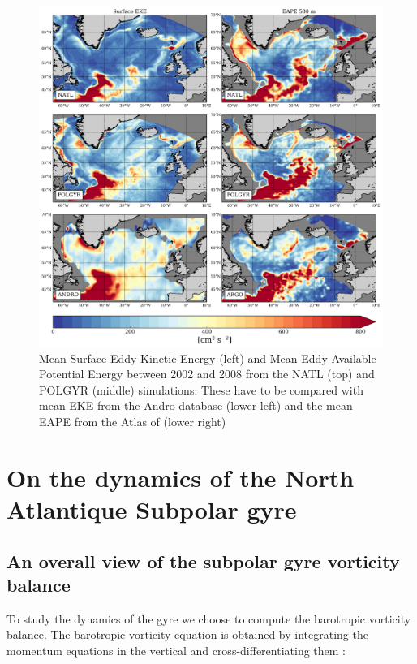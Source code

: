 \documentclass[11pt,a4paper]{article}
\begin{document}
\begin{figure}[H]
\centerline{\includegraphics[width=18cm]{./fig/eke_eape_basemap_vert.png}}
\caption{Mean Surface Eddy Kinetic Energy (left) and Mean Eddy Available Potential Energy between 2002 and 2008 from the NATL (top) and POLGYR (middle) simulations. These have to be compared with mean EKE from the Andro database (lower left) and the mean EAPE from the Atlas of \citet{roullet2014} (lower right)}
\label{energy}
\end{figure}



\section{On the dynamics of the North Atlantique Subpolar gyre }

\subsection{An overall view of the subpolar gyre vorticity balance}

To study the dynamics of the gyre we choose to compute the barotropic vorticity balance. The barotropic vorticity equation is obtained by integrating the momentum equations in the vertical and cross-differentiating them \citep{gula2015}:
\end{document}
